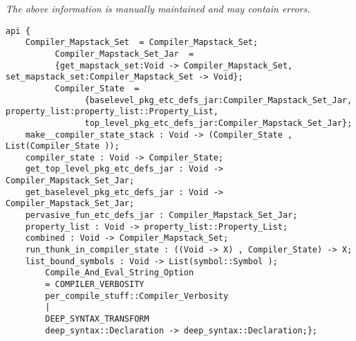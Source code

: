 \label{api:Compiler\_State}

{\tiny \it The above information is manually maintained and may contain errors.}
\begin{verbatim}
api {
    Compiler_Mapstack_Set  = Compiler_Mapstack_Set;
          Compiler_Mapstack_Set_Jar  =
          {get_mapstack_set:Void -> Compiler_Mapstack_Set, set_mapstack_set:Compiler_Mapstack_Set -> Void};
          Compiler_State  =
                {baselevel_pkg_etc_defs_jar:Compiler_Mapstack_Set_Jar, property_list:property_list::Property_List,
                top_level_pkg_etc_defs_jar:Compiler_Mapstack_Set_Jar};
    make__compiler_state_stack : Void -> (Compiler_State , List(Compiler_State ));
    compiler_state : Void -> Compiler_State;
    get_top_level_pkg_etc_defs_jar : Void -> Compiler_Mapstack_Set_Jar;
    get_baselevel_pkg_etc_defs_jar : Void -> Compiler_Mapstack_Set_Jar;
    pervasive_fun_etc_defs_jar : Compiler_Mapstack_Set_Jar;
    property_list : Void -> property_list::Property_List;
    combined : Void -> Compiler_Mapstack_Set;
    run_thunk_in_compiler_state : ((Void -> X) , Compiler_State) -> X;
    list_bound_symbols : Void -> List(symbol::Symbol );
        Compile_And_Eval_String_Option
        = COMPILER_VERBOSITY
        per_compile_stuff::Compiler_Verbosity
        |
        DEEP_SYNTAX_TRANSFORM
        deep_syntax::Declaration -> deep_syntax::Declaration;};
\end{verbatim}
